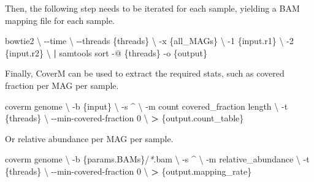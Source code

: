 \documentclass[
]{book}
\newenvironment{Shaded}{\begin{snugshade}}{\end{snugshade}}
\newcommand{\AttributeTok}[1]{\textcolor[rgb]{0.77,0.63,0.00}{#1}}
\newcommand{\DataTypeTok}[1]{\textcolor[rgb]{0.13,0.29,0.53}{#1}}
\newcommand{\ExtensionTok}[1]{#1}
\newcommand{\KeywordTok}[1]{\textcolor[rgb]{0.13,0.29,0.53}{\textbf{#1}}}
\newcommand{\NormalTok}[1]{#1}
\newcommand{\OperatorTok}[1]{\textcolor[rgb]{0.81,0.36,0.00}{\textbf{#1}}}
\newcommand{\PreprocessorTok}[1]{\textcolor[rgb]{0.56,0.35,0.01}{\textit{#1}}}
\begin{document}
Then, the following step needs to be iterated for each sample, yielding a BAM mapping file for each sample.

\begin{Shaded}
\begin{Highlighting}[]
\ExtensionTok{bowtie2} \DataTypeTok{\textbackslash{}}
      \AttributeTok{{-}{-}time} \DataTypeTok{\textbackslash{}}
      \AttributeTok{{-}{-}threads}\NormalTok{ \{threads\} }\DataTypeTok{\textbackslash{}}
      \AttributeTok{{-}x}\NormalTok{ \{all\_MAGs\} }\DataTypeTok{\textbackslash{}}
      \AttributeTok{{-}1}\NormalTok{ \{input.r1\} }\DataTypeTok{\textbackslash{}}
      \AttributeTok{{-}2}\NormalTok{ \{input.r2\} }\DataTypeTok{\textbackslash{}}
      \KeywordTok{|} \ExtensionTok{samtools}\NormalTok{ sort }\AttributeTok{{-}@}\NormalTok{ \{threads\} }\AttributeTok{{-}o}\NormalTok{ \{output\}}
\end{Highlighting}
\end{Shaded}

Finally, CoverM can be used to extract the required stats, such as covered fraction per MAG per sample.

\begin{Shaded}
\begin{Highlighting}[]
\ExtensionTok{coverm}\NormalTok{ genome }\DataTypeTok{\textbackslash{}}
      \AttributeTok{{-}b}\NormalTok{ \{input\} }\DataTypeTok{\textbackslash{}}
      \AttributeTok{{-}s}\NormalTok{ \^{} }\DataTypeTok{\textbackslash{}}
      \AttributeTok{{-}m}\NormalTok{ count covered\_fraction length }\DataTypeTok{\textbackslash{}}
      \AttributeTok{{-}t}\NormalTok{ \{threads\} }\DataTypeTok{\textbackslash{}}
      \AttributeTok{{-}{-}min{-}covered{-}fraction}\NormalTok{ 0 }\DataTypeTok{\textbackslash{}}
      \OperatorTok{\textgreater{}}\NormalTok{ \{output.count\_table\}}
\end{Highlighting}
\end{Shaded}

Or relative abundance per MAG per sample.

\begin{Shaded}
\begin{Highlighting}[]
\ExtensionTok{coverm}\NormalTok{ genome }\DataTypeTok{\textbackslash{}}
      \AttributeTok{{-}b}\NormalTok{ \{params.BAMs\}/}\PreprocessorTok{*}\NormalTok{.bam }\DataTypeTok{\textbackslash{}}
      \AttributeTok{{-}s}\NormalTok{ \^{} }\DataTypeTok{\textbackslash{}}
      \AttributeTok{{-}m}\NormalTok{ relative\_abundance }\DataTypeTok{\textbackslash{}}
      \AttributeTok{{-}t}\NormalTok{ \{threads\} }\DataTypeTok{\textbackslash{}}
      \AttributeTok{{-}{-}min{-}covered{-}fraction}\NormalTok{ 0 }\DataTypeTok{\textbackslash{}}
      \OperatorTok{\textgreater{}}\NormalTok{ \{output.mapping\_rate\}}
\end{Highlighting}
\end{Shaded}
\end{document}
